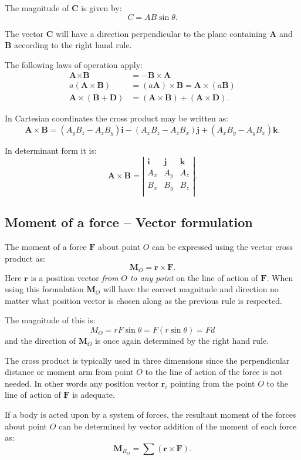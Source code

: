 The magnitude of $\textbf{C}$ is given by:
\[ 
C = AB \sin \theta
.\]

The vector $\textbf{C}$ will have a direction perpendicular to the plane containing $\textbf{A}$ and $\textbf{B}$ according to the right hand rule.

The following laws of operation apply:
\begin{align*}
  \textbf{A} \times \textbf{B} &= - \textbf{B} \times \textbf{A} \\
  a \left( \textbf{A} \times \textbf{B} \right) &= (a \textbf{A}) \times \textbf{B} = \textbf{A} \times \left( a \textbf{B} \right) \\
  \textbf{A} \times \left( \textbf{B} + \textbf{D} \right) &= \left( \textbf{A} \times \textbf{B} \right) + \left( \textbf{A} \times \textbf{D} \right)
.\end{align*}

In Cartesian coordinates the cross product may be written as:
\[ 
\textbf{A} \times \textbf{B} = \left( A_y B_z - A_z B_y \right) \textbf{i} - \left( A_x B_z - A_z B_x \right) \textbf{j} + \left( A_x B_y - A_y B_x \right) \textbf{k}
.\]

In determinant form it is:
\[ 
\textbf{A} \times \textbf{B} = \left| \begin{array}{ccc}
\textbf{i} & \textbf{j} & \textbf{k}\\
A_x & A_y & A_z\\
B_x & B_y & B_z\\
\end{array} \right|
.\]

\subsection{Moment of a force -- Vector formulation}
The moment of a force $\textbf{F}$ about point $O$ can be expressed using the vector cross product as:
\[ 
\textbf{M}_O = \textbf{r} \times \textbf{F}
.\]
Here $\textbf{r}$ is a position vector \textit{from} $O$ \textit{to any point} on the line of action of $\textbf{F}$. When using this formulation $\textbf{M}_O$ will have the correct magnitude and direction no matter what position vector is chosen along as the previous rule is respected.

The magnitude of this is:
\[ 
M_O = r F \sin \theta = F \left( r \sin \theta \right) = Fd
\]
and the direction of $\textbf{M}_O$ is once again determined by the right hand rule. 

The cross product is typically used in three dimensions since the perpendicular distance or moment arm from point $O$ to the line of action of the force is not needed. In other words any position vector $\textbf{r}_i$ pointing from the point $O$ to the line of action of $\textbf{F}$ is adequate. 

If a body is acted upon by a system of forces, the resultant moment of the forces about point $O$ can be determined by vector addition of the moment of each force as:
\[ 
\textbf{M}_{R_O} = \sum \left( \textbf{r} \times \textbf{F} \right)
.\]

